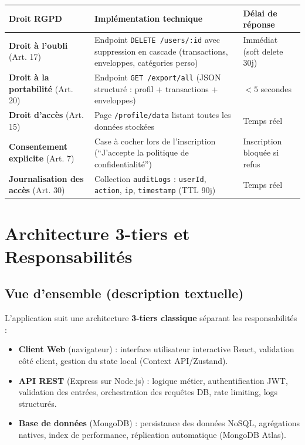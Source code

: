 \begin{center}
\begin{tabular}{|p{4cm}|p{5cm}|p{4.5cm}|}
\hline
\textbf{Droit RGPD} & \textbf{Implémentation technique} & \textbf{Délai de réponse} \\
\hline
\textbf{Droit à l'oubli} (Art. 17) & Endpoint \texttt{DELETE /users/:id} avec suppression en cascade (transactions, enveloppes, catégories perso) & Immédiat (soft delete 30j) \\
\hline
\textbf{Droit à la portabilité} (Art. 20) & Endpoint \texttt{GET /export/all} (JSON structuré : profil + transactions + enveloppes) & $< 5$ secondes \\
\hline
\textbf{Droit d'accès} (Art. 15) & Page \texttt{/profile/data} listant toutes les données stockées & Temps réel \\
\hline
\textbf{Consentement explicite} (Art. 7) & Case à cocher lors de l'inscription (``J'accepte la politique de confidentialité'') & Inscription bloquée si refus \\
\hline
\textbf{Journalisation des accès} (Art. 30) & Collection \texttt{auditLogs} : \texttt{userId}, \texttt{action}, \texttt{ip}, \texttt{timestamp} (TTL 90j) & Temps réel \\
\hline
\end{tabular}
\end{center}

\section{Architecture 3-tiers et Responsabilités}

\subsection{Vue d'ensemble (description textuelle)}

L'application suit une architecture \textbf{3-tiers classique} séparant les responsabilités :

\begin{itemize}
  \item \textbf{Client Web} (navigateur) : interface utilisateur interactive React, validation côté client, gestion du state local (Context API/Zustand).
  \item \textbf{API REST} (Express sur Node.js) : logique métier, authentification JWT, validation des entrées, orchestration des requêtes DB, rate limiting, logs structurés.
  \item \textbf{Base de données} (MongoDB) : persistance des données NoSQL, agrégations natives, index de performance, réplication automatique (MongoDB Atlas).
\end{itemize}

